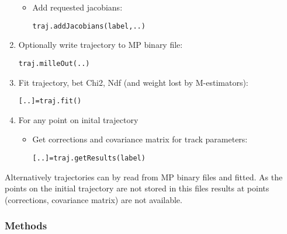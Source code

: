 \begin{enumerate}
\begin{itemize}
        \item Add requested jacobians:

\begin{alltt}
   traj.addJacobians(label,..)  \end{alltt}

      \end{itemize}

    \item Optionally write trajectory to MP binary file:

\begin{alltt}
       traj.milleOut(..)\end{alltt}

    \item Fit trajectory, bet Chi2, Ndf (and weight lost by M-estimators):

\begin{alltt}
       [..] = traj.fit()\end{alltt}

    \item For any point on inital trajectory

      \begin{itemize}
      \setlength{\parskip}{0.6ex}
        \item Get corrections and covariance matrix for track parameters:

\begin{alltt}
   [..] = traj.getResults(label) \end{alltt}

      \end{itemize}

  \end{enumerate}

  Alternatively trajectories can by read from MP binary files and fitted. 
  As the points on the initial trajectory are not stored in this files 
  results at points (corrections, covariance matrix) are not available.



  \subsubsection{Methods}

    \vspace{0.5ex}

